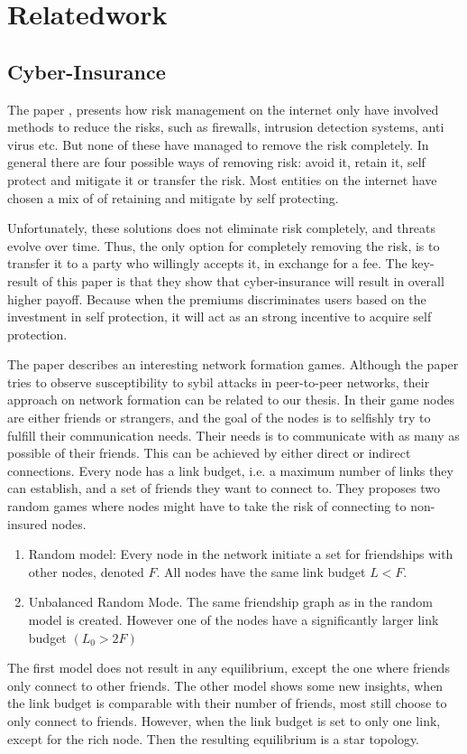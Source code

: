 \chapter{Relatedwork}
\label{chp:relatedwork} 



\section{Cyber-Insurance}


The paper \cite{bolot2008cyber}, presents how risk management on the internet only have involved methods to reduce the risks, such as firewalls, intrusion detection systems, anti virus etc. But none of these have managed to remove the risk completely. In general there are four possible ways of removing risk: avoid it, retain it, self protect and mitigate it or transfer the risk. Most entities on the internet have chosen a mix of of retaining and mitigate by self protecting. 

Unfortunately, these solutions does not eliminate risk completely, and threats evolve over time. Thus, the only option for completely removing the risk, is to transfer it to a party who willingly accepts it, in exchange for a fee. The key-result of this paper is that they show that cyber-insurance will result in overall higher payoff. Because when the premiums discriminates users based on the investment in self protection, it will act as an strong incentive to acquire self protection. 

The paper \cite{danezis2006network} describes an interesting network formation games. Although the paper tries to observe susceptibility to sybil attacks in peer-to-peer networks, their approach on network formation can be related to our thesis. In their game nodes are either friends or strangers, and the goal of the nodes is to selfishly try to fulfill their communication needs. Their needs is to communicate with as many as possible of their friends. This can be achieved by either direct or indirect connections. Every node has a link budget, i.e. a maximum number of links they can establish, and a set of friends they want to connect to. 
They proposes two random games where nodes might have to take the risk of connecting to non-insured nodes.
\begin{enumerate}
\item Random model: Every node in the network initiate a set for friendships with other nodes, denoted $F$. All nodes have the same link budget $L<F$. 
\item Unbalanced Random Mode. The same friendship graph as in the random model is created. However one of the nodes have a significantly larger link budget $(L_{0} > 2 F)$
\end{enumerate}
The first model does not result in any equilibrium, except the one where friends only connect to other friends.
The other model shows some new insights, when the link budget is comparable with their number of friends, most still choose to only connect to friends. However, when the link budget is set to only one link, except for the rich node. Then the resulting equilibrium is a star topology. 

